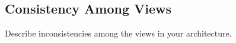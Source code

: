 \subsection{Consistency Among Views}

Describe inconsistencies among the views in your architecture.	
